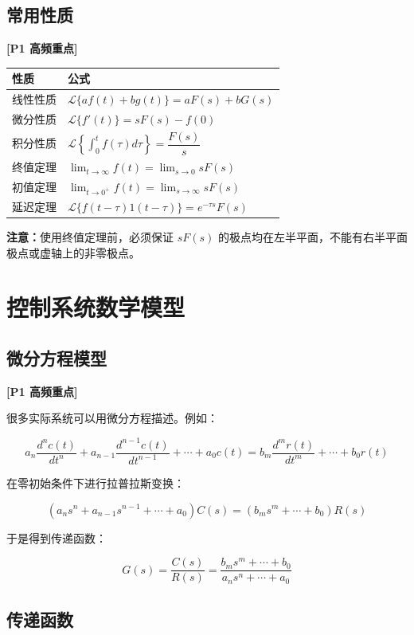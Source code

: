 \documentclass[UTF8,a4paper,12pt]{ctexart}
\newcommand{\Pone}{\textcolor{p1}{\textbf{[P1 高频重点]}}}
\newcommand{\note}{\textcolor{note}{\textbf{注意：}}}
\begin{document}
\subsection{常用性质}

\Pone

\begin{longtable}{p{5cm}p{8cm}}
\toprule
性质 & 公式 \\
\midrule
线性性质 & $\mathcal{L}\{af(t)+bg(t)\}=aF(s)+bG(s)$ \\
微分性质 & $\mathcal{L}\{f'(t)\}=sF(s)-f(0)$ \\
积分性质 & $\mathcal{L}\left\{\int_0^t f(\tau)d\tau\right\}=\dfrac{F(s)}{s}$ \\
终值定理 & $\displaystyle \lim_{t\to\infty}f(t)=\lim_{s\to0}sF(s)$ \\
初值定理 & $\displaystyle \lim_{t\to0^+}f(t)=\lim_{s\to\infty}sF(s)$ \\
延迟定理 & $\mathcal{L}\{f(t-\tau)1(t-\tau)\}=e^{-\tau s}F(s)$ \\
\bottomrule
\end{longtable}

\note 使用终值定理前，必须保证 $sF(s)$ 的极点均在左半平面，不能有右半平面极点或虚轴上的非零极点。

\section{控制系统数学模型}

\subsection{微分方程模型}

\Pone

很多实际系统可以用微分方程描述。例如：

\[
a_n\frac{d^n c(t)}{dt^n}+a_{n-1}\frac{d^{n-1} c(t)}{dt^{n-1}}+\cdots+a_0c(t)
=
b_m\frac{d^m r(t)}{dt^m}+\cdots+b_0r(t)
\]

在零初始条件下进行拉普拉斯变换：

\[
(a_ns^n+a_{n-1}s^{n-1}+\cdots+a_0)C(s)
=
(b_ms^m+\cdots+b_0)R(s)
\]

于是得到传递函数：

\[
G(s)=\frac{C(s)}{R(s)}
=
\frac{b_ms^m+\cdots+b_0}{a_ns^n+\cdots+a_0}
\]

\subsection{传递函数}
\end{document}

